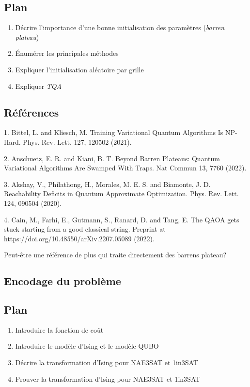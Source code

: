 \subsection*{Plan}

\begin{enumerate}
    \item Décrire l'importance d'une bonne initialisation des paramètres (\textit{barren plateau})
    \item Énumérer les principales méthodes
    \item Expliquer l'initialisation aléatoire par grille
    \item Expliquer \textit{TQA}
\end{enumerate}

\subsection*{Références}

1. Bittel, L. and Kliesch, M. Training Variational Quantum Algorithms Is NP-Hard. Phys. Rev. Lett. 127, 120502 (2021).

2. Anschuetz, E. R. and Kiani, B. T. Beyond Barren Plateaus: Quantum Variational Algorithms Are Swamped With Traps. Nat Commun 13, 7760 (2022).

3. Akshay, V., Philathong, H., Morales, M. E. S. and Biamonte, J. D. Reachability Deficits in Quantum Approximate Optimization. Phys. Rev. Lett. 124, 090504 (2020).
    
4. Cain, M., Farhi, E., Gutmann, S., Ranard, D. and Tang, E. The QAOA gets stuck starting from a good classical string. Preprint at https://doi.org/10.48550/arXiv.2207.05089 (2022).

Peut-être une référence de plus qui traite directement des barrens plateau?


\subsection{Encodage du problème}

\subsection*{Plan}

\begin{enumerate}
    \item Introduire la fonction de coût
    \item Introduire le modèle d'Ising et le modèle QUBO
    \item Décrire la transformation d'Ising pour NAE3SAT et 1in3SAT
    \item Prouver la transformation d'Ising pour NAE3SAT et 1in3SAT
\end{enumerate}

